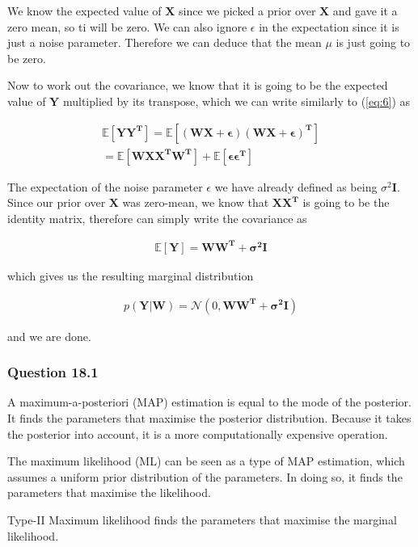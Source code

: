 \documentclass[10pt, a4paper, twocolumn]{article} %
\begin{document}
We know the expected value of $\mathbf{X}$ since we picked a prior over $\mathbf{X}$ and gave it a zero mean, so ti will be zero. We can also ignore $\epsilon$ in the expectation since it is just a noise parameter. Therefore we can deduce that the mean $\mu$ is just going to be zero.

Now to work out the covariance, we know that it is going to be the expected value of $\mathbf{Y}$ multiplied by its transpose, which we can write similarly to (\ref{eq:6}) as

\begin{align}
  \mathbb{E}[\mathbf{YY^T}] = \mathbb{E}[\mathbf{(WX + \epsilon)(WX + \epsilon)^T}] \\
  = \mathbb{E}[\mathbf{WXX^TW^T}] + \mathbb{E}[\mathbf{\epsilon\epsilon^T}]
\end{align}

The expectation of the noise parameter $\epsilon$ we have already defined as being $\sigma^2\mathbf{I}$. Since our prior over $\mathbf{X}$ was zero-mean, we know that $\mathbf{XX^T}$ is going to be the identity matrix, therefore can simply write the covariance as

\begin{align}
  \mathbb{E}[\mathbf{Y}] = \mathbf{WW^T + \sigma^2I}
\end{align}

which gives us the resulting marginal distribution

\begin{align}
  p(\mathbf{Y|W}) = \mathcal{N}(0, \mathbf{WW^T + \sigma^2I})
\end{align}

and we are done.

\subsubsection*{Question 18.1}
A maximum-a-posteriori (MAP) estimation is equal to the mode of the posterior. It finds the parameters that maximise the posterior distribution. Because it takes the posterior into account, it is a more computationally expensive operation. \par
The maximum likelihood (ML) can be seen as a type of MAP estimation, which assumes a uniform prior distribution of the parameters. In doing so, it finds the parameters that maximise the likelihood. \par
Type-II Maximum likelihood finds the parameters that maximise the marginal likelihood. 
\end{document}
